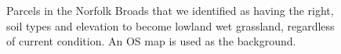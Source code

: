 \documentclass[
  12pt,
  letterpaper,
  DIV=11,
  numbers=noendperiod]{scrartcl}
\begin{document}
\begin{figure}[H]


\caption{\label{fig-BroadsSuitHab}Parcels in the Norfolk Broads that we
identified as having the right, soil types and elevation to become
lowland wet grassland, regardless of current condition. An OS map is
used as the background.}

\end{figure}%
\end{document}
